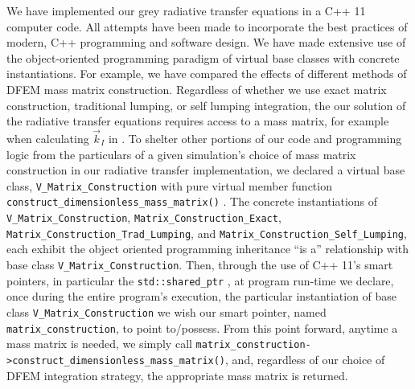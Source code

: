 We have implemented our grey radiative transfer equations in a C++ 11 computer code.
All attempts have been made to incorporate the best practices of modern, C++ programming and software design\cite{cpp_book,effective_cpp}.
We have made extensive use of the object-oriented programming paradigm of virtual base classes with concrete instantiations.
For example, we have compared the effects of different methods of DFEM mass matrix construction.
Regardless of whether we use exact matrix construction, traditional lumping, or self lumping integration, the our solution of the radiative transfer equations requires access to a mass matrix, for example when calculating $\vec{k}_I$ in .
To shelter other portions of our code and programming logic from the particulars of a given simulation's choice of mass matrix construction in our radiative transfer implementation, we declared a virtual base class, \verb+V_Matrix_Construction+ with pure virtual member function \verb+construct_dimensionless_mass_matrix()+ .
The concrete instantiations of \verb+V_Matrix_Construction+, \verb+Matrix_Construction_Exact+, \verb+Matrix_Construction_Trad_Lumping+, and \verb+Matrix_Construction_Self_Lumping+, each exhibit the object oriented programming inheritance ``is a'' relationship with base class \verb+V_Matrix_Construction+.
Then, through the use of C++ 11's smart pointers, in particular the \verb+std::shared_ptr+ ,  at program run-time we declare, once during the entire program's execution, the particular instantiation of base class \verb+V_Matrix_Construction+  we wish our smart pointer, named \verb+matrix_construction+, to point to/possess.
From this point forward, anytime a mass matrix is needed, we simply call \verb+matrix_construction->construct_dimensionless_mass_matrix()+, and, regardless of our choice of DFEM integration strategy, the appropriate mass matrix is returned.

